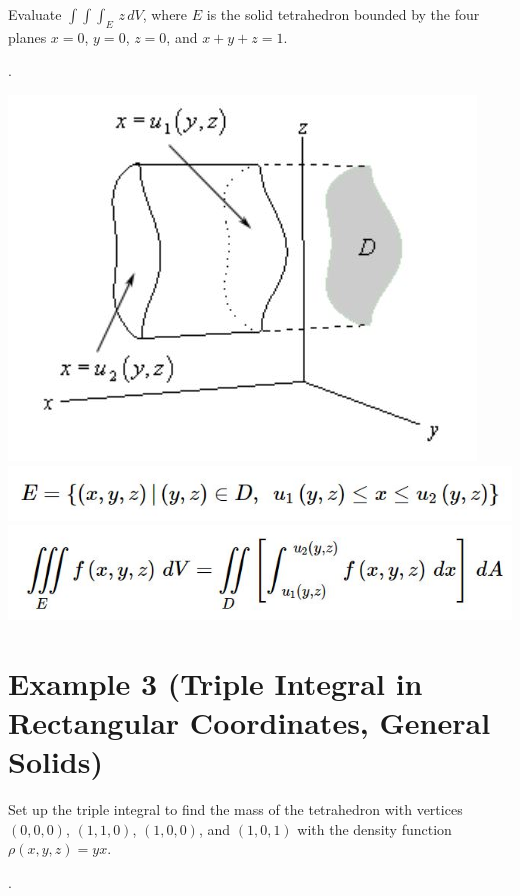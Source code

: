 \documentclass[11pt]{article}
\begin{document}
Evaluate $\int\int\int_E \, z \, dV$, where $E$ is the solid tetrahedron bounded by the four planes $x = 0$, $y = 0$, $z= 0$, and $x + y + z = 1$. \newpage

.

\newpage

\includegraphics{Capture4.jpg}\\
\includegraphics{Capture5.jpg}\\
\includegraphics{Capture6.jpg}
\section*{Example 3 (Triple Integral in Rectangular Coordinates, General Solids)}


Set up the triple integral to find the mass of the tetrahedron with vertices $(0,0,0)$, $(1,1,0)$, $(1,0,0)$, and $(1,0,1)$ with the density function $\rho(x,y,z) = yx$. 

\newpage

.

\newpage
\end{document}
